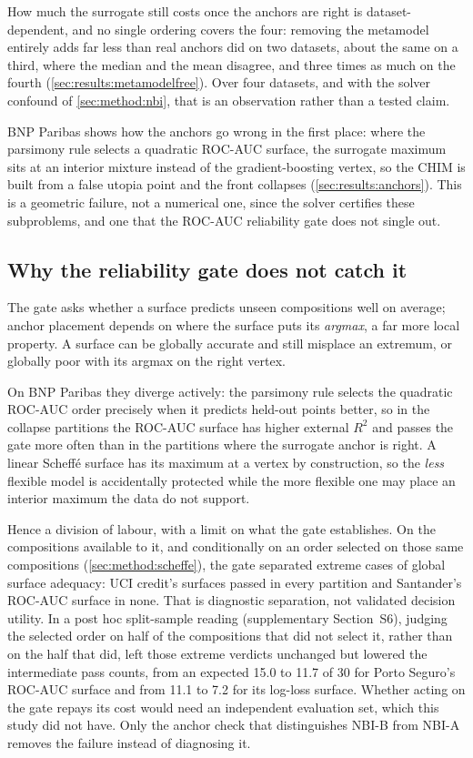 How much the surrogate still costs once the anchors are right is dataset-dependent, and no single ordering covers the
four: removing the metamodel entirely adds far less than real anchors did on two datasets, about the same on a third,
where the median and the mean disagree, and three times as much on the fourth (\cref{sec:results:metamodelfree}). Over
four datasets, and with the solver confound of \cref{sec:method:nbi}, that is an observation rather than a tested
claim.

BNP Paribas shows how the anchors go wrong in the first place: where the parsimony rule selects a quadratic ROC-AUC
surface, the surrogate maximum sits at an interior mixture instead of the gradient-boosting vertex, so the CHIM is
built from a false utopia point and the front collapses (\cref{sec:results:anchors}). This is a geometric failure,
not a numerical one, since the solver certifies these subproblems, and one that the ROC-AUC reliability gate does not
single out.

\subsection{Why the reliability gate does not catch it}
\label{sec:disc:gate}

The gate asks whether a surface predicts unseen compositions well on average; anchor placement depends on where the
surface puts its \emph{argmax}, a far more local property. A surface can be globally accurate and still misplace an
extremum, or globally poor with its argmax on the right vertex.

On BNP Paribas they diverge actively: the parsimony rule selects the quadratic ROC-AUC order precisely when it
predicts held-out points better, so in the collapse partitions the ROC-AUC surface has higher external $R^2$ and
passes the gate more often than in the partitions where the surrogate anchor is right. A linear Scheff\'e surface has
its maximum at a vertex by
construction, so the \emph{less} flexible model is accidentally protected while the more flexible one may place an
interior maximum the data do not support.

Hence a division of labour, with a limit on what the gate establishes. On the compositions available to it, and
conditionally on an order selected on those same compositions (\cref{sec:method:scheffe}), the gate separated
extreme cases of global surface adequacy: UCI credit's surfaces passed in every partition and Santander's ROC-AUC
surface in none. That is diagnostic separation, not validated decision utility. In a post hoc split-sample reading
(supplementary Section~S6), judging the selected order on half of the compositions that did not select it, rather
than on the half that did, left those extreme verdicts unchanged but lowered the intermediate pass counts, from an
expected 15.0 to 11.7 of 30 for Porto Seguro's ROC-AUC surface and from 11.1 to 7.2 for its log-loss surface.
Whether acting on the gate repays its cost would need an independent evaluation set, which this study did not have.
Only the anchor check that distinguishes NBI-B from NBI-A removes the failure instead of diagnosing it.

